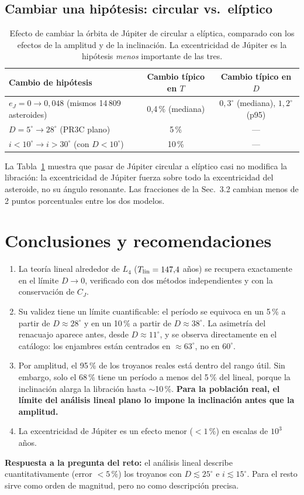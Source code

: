 \documentclass[11pt, a4paper]{article}
\newcommand{\Tlin}{T_{\rm lin}}
\begin{document}
\subsection{Cambiar una hipótesis: circular vs.\ elíptico}
\begin{table}[h]
\centering\small
\caption{Efecto de cambiar la órbita de Júpiter de circular a elíptica, comparado con los efectos de la amplitud y de la inclinación. La excentricidad de Júpiter es la hipótesis \emph{menos} importante de las tres.}
\label{tab:comp}
\begin{tabular}{lcc}
\toprule
Cambio de hipótesis & Cambio típico en $T$ & Cambio típico en $D$\\\midrule
$e_J=0\to0{,}048$ (mismos 14\,809 asteroides) & 0,4\,\% (mediana) & $0{,}3^\circ$ (mediana), $1{,}2^\circ$ (p95)\\
$D=5^\circ\to28^\circ$ (PR3C plano) & 5\,\% & ---\\
$i<10^\circ\to i>30^\circ$ (con $D<10^\circ$) & 10\,\% & ---\\
\bottomrule
\end{tabular}
\end{table}
La Tabla~\ref{tab:comp} muestra que pasar de Júpiter circular a elíptico casi no modifica la libración: la excentricidad de Júpiter fuerza sobre todo la excentricidad del asteroide, no su ángulo resonante. Las fracciones de la Sec.~3.2 cambian menos de 2 puntos porcentuales entre los dos modelos.

\section{Conclusiones y recomendaciones}\label{sec:conc}
\begin{enumerate}\setlength\itemsep{1pt}
\item La teoría lineal alrededor de $L_4$ ($\Tlin=147{,}4$ años) se recupera exactamente en el límite $D\to0$, verificado con dos métodos independientes y con la conservación de $C_J$.
\item Su validez tiene un límite cuantificable: el período se equivoca en un 5\,\% a partir de $D\approx28^\circ$ y en un 10\,\% a partir de $D\approx38^\circ$. La asimetría del renacuajo aparece antes, desde $D\approx11^\circ$, y se observa directamente en el catálogo: los enjambres están centrados en $\approx63^\circ$, no en $60^\circ$.
\item Por amplitud, el 95\,\% de los troyanos reales está dentro del rango útil. Sin embargo, solo el 68\,\% tiene un período a menos del 5\,\% del lineal, porque la inclinación alarga la libración hasta $\sim$10\,\%. \textbf{Para la población real, el límite del análisis lineal plano lo impone la inclinación antes que la amplitud.}
\item La excentricidad de Júpiter es un efecto menor ($<1\,\%$) en escalas de $10^3$ años.
\end{enumerate}
\textbf{Respuesta a la pregunta del reto:} el análisis lineal describe cuantitativamente (error $<5\,\%$) los troyanos con $D\lesssim25^\circ$ e $i\lesssim15^\circ$. Para el resto sirve como orden de magnitud, pero no como descripción precisa.
\end{document}
